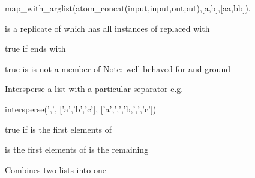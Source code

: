 \begin{description}
\begin{code}
map_with_arglist(atom_concat(input,input,output),[a,b],[aa,bb]).
\end{code}

 is a replicate of  which has all instances
of  replaced with  

true if  ends with 

true is  is not a member of 
Note: well-behaved for  and  ground

Intersperse a list with a particular separator
e.g.

\begin{code}
intersperse(',', ['a','b','c'], ['a',',','b,',','c'])
\end{code}

true if  is the first  elements of 

 is the first  elements of 
 is the remaining

Combines two lists into one
\end{description}

